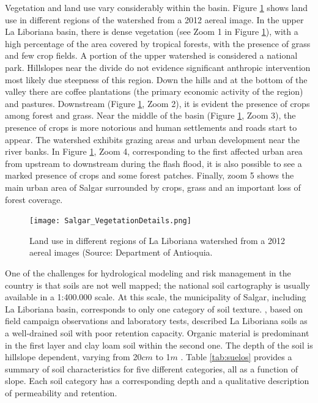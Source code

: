 \documentclass[hess, manuscript]{copernicus}
\begin{document}

Vegetation and land use vary considerably within the basin. Figure \ref{fig:landuse} shows land use in different regions of the watershed from a 2012 aereal image. In the upper La Liboriana basin, there is dense vegetation (see Zoom 1 in Figure \ref{fig:landuse}), with a high percentage of the area covered by tropical forests, with the presence of grass and few crop fields.  A portion of the upper watershed is considered a national park. Hillslopes near the divide do not evidence significant anthropic intervention most likely due steepness of this region.  Down the hills and at the bottom of the valley there are coffee plantations (the primary economic activity of the region) and pastures.  Downstream (Figure \ref{fig:landuse}, Zoom 2), it is evident the presence of crops among forest and grass. Near the middle of the basin (Figure \ref{fig:landuse}, Zoom 3), the presence of crops is more notorious and human settlements and roads start to appear. The watershed exhibits grazing areas and urban development near the river banks.  In Figure \ref{fig:landuse}, Zoom 4, corresponding to the first affected urban area from upstream to downstream during the flash flood, it is also possible to see a marked presence of crops and some forest patches.  Finally, zoom 5 shows the main urban area of Salgar surrounded by crops, grass and an important loss of forest coverage. \\

\begin{figure}[t]
\centering
\texttt{[image: Salgar\_VegetationDetails.png]}
\caption{Land use in different regions of La Liboriana watershed from a 2012 aereal images (Source: Department of Antioquia.}
\label{fig:landuse}
\end{figure}


One of the challenges for hydrological modeling and risk management in the country is that soils are not well mapped; the national soil cartography is usually available in a 1:400.000 scale. At this scale, the municipality of Salgar, including La Liboriana basin,  corresponds to only one category of soil texture. \citet{Osorio2008}, based on field campaign observations and laboratory tests, described La Liboriana soils as a well-drained soil with poor retention capacity.  Organic material is predominant in the first layer and clay loam soil within the second one.  The depth of the soil is hillslope dependent, varying from 20$cm$ to 1$m$ \citep{Osorio2008}. Table \ref{tab:suelos} provides a summary of soil characteristics for five different categories, all as a function of slope. Each soil category has a corresponding depth and a qualitative description of permeability and retention.\\
\end{document}
